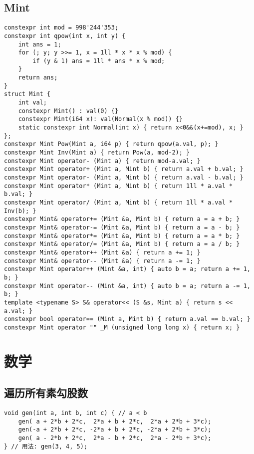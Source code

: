\documentclass[a4paper,landscape,twocolumn]{ctexart}
\begin{document}
\subsection{Mint}

\begin{lstlisting}[]
constexpr int mod = 998'244'353;
constexpr int qpow(int x, int y) {
	int ans = 1;
	for (; y; y >>= 1, x = 1ll * x * x % mod) {
		if (y & 1) ans = 1ll * ans * x % mod;
	}
	return ans;
}
struct Mint {
	int val;
	constexpr Mint() : val(0) {}
	constexpr Mint(i64 x): val(Normal(x % mod)) {}
	static constexpr int Normal(int x) { return x<0&&(x+=mod), x; }
};
constexpr Mint Pow(Mint a, i64 p) { return qpow(a.val, p); }
constexpr Mint Inv(Mint a) { return Pow(a, mod-2); }
constexpr Mint operator- (Mint a) { return mod-a.val; }
constexpr Mint operator+ (Mint a, Mint b) { return a.val + b.val; }
constexpr Mint operator- (Mint a, Mint b) { return a.val - b.val; }
constexpr Mint operator* (Mint a, Mint b) { return 1ll * a.val * b.val; }
constexpr Mint operator/ (Mint a, Mint b) { return 1ll * a.val * Inv(b); }
constexpr Mint& operator+= (Mint &a, Mint b) { return a = a + b; }
constexpr Mint& operator-= (Mint &a, Mint b) { return a = a - b; }
constexpr Mint& operator*= (Mint &a, Mint b) { return a = a * b; }
constexpr Mint& operator/= (Mint &a, Mint b) { return a = a / b; }
constexpr Mint& operator++ (Mint &a) { return a += 1; }
constexpr Mint& operator-- (Mint &a) { return a -= 1; }
constexpr Mint operator++ (Mint &a, int) { auto b = a; return a += 1, b; }
constexpr Mint operator-- (Mint &a, int) { auto b = a; return a -= 1, b; }
template <typename S> S& operator<< (S &s, Mint a) { return s << a.val; }
constexpr bool operator== (Mint a, Mint b) { return a.val == b.val; }
constexpr Mint operator "" _M (unsigned long long x) { return x; }
\end{lstlisting}

\section{数学}

\subsection{遍历所有素勾股数}

\begin{lstlisting}
void gen(int a, int b, int c) { // a < b
    gen( a + 2*b + 2*c,  2*a + b + 2*c,  2*a + 2*b + 3*c);
    gen(-a + 2*b + 2*c, -2*a + b + 2*c, -2*a + 2*b + 3*c);
    gen( a - 2*b + 2*c,  2*a - b + 2*c,  2*a - 2*b + 3*c);
} // 用法: gen(3, 4, 5);
\end{lstlisting}
\end{document}
